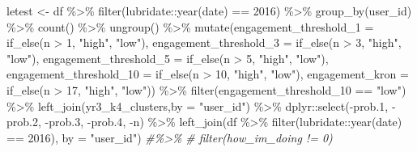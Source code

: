 \documentclass[
]{article}
\newenvironment{Shaded}{\begin{snugshade}}{\end{snugshade}}
\newcommand{\AttributeTok}[1]{\textcolor[rgb]{0.77,0.63,0.00}{#1}}
\newcommand{\CommentTok}[1]{\textcolor[rgb]{0.56,0.35,0.01}{\textit{#1}}}
\newcommand{\DecValTok}[1]{\textcolor[rgb]{0.00,0.00,0.81}{#1}}
\newcommand{\FloatTok}[1]{\textcolor[rgb]{0.00,0.00,0.81}{#1}}
\newcommand{\FunctionTok}[1]{\textcolor[rgb]{0.00,0.00,0.00}{#1}}
\newcommand{\NormalTok}[1]{#1}
\newcommand{\OtherTok}[1]{\textcolor[rgb]{0.56,0.35,0.01}{#1}}
\newcommand{\SpecialCharTok}[1]{\textcolor[rgb]{0.00,0.00,0.00}{#1}}
\newcommand{\StringTok}[1]{\textcolor[rgb]{0.31,0.60,0.02}{#1}}
\begin{document}
\begin{Shaded}
\begin{Highlighting}[]
\NormalTok{letest }\OtherTok{\textless{}{-}}\NormalTok{  df }\SpecialCharTok{\%\textgreater{}\%}
  \FunctionTok{filter}\NormalTok{(lubridate}\SpecialCharTok{::}\FunctionTok{year}\NormalTok{(date) }\SpecialCharTok{==} \DecValTok{2016}\NormalTok{) }\SpecialCharTok{\%\textgreater{}\%}
  \FunctionTok{group\_by}\NormalTok{(user\_id) }\SpecialCharTok{\%\textgreater{}\%}
  \FunctionTok{count}\NormalTok{() }\SpecialCharTok{\%\textgreater{}\%}
  \FunctionTok{ungroup}\NormalTok{() }\SpecialCharTok{\%\textgreater{}\%} 
  \FunctionTok{mutate}\NormalTok{(}\AttributeTok{engagement\_threshold\_1 =} \FunctionTok{if\_else}\NormalTok{(n }\SpecialCharTok{\textgreater{}} \DecValTok{1}\NormalTok{, }\StringTok{"high"}\NormalTok{, }\StringTok{"low"}\NormalTok{),}
         \AttributeTok{engagement\_threshold\_3 =} \FunctionTok{if\_else}\NormalTok{(n }\SpecialCharTok{\textgreater{}} \DecValTok{3}\NormalTok{, }\StringTok{"high"}\NormalTok{, }\StringTok{"low"}\NormalTok{),}
         \AttributeTok{engagement\_threshold\_5 =} \FunctionTok{if\_else}\NormalTok{(n }\SpecialCharTok{\textgreater{}} \DecValTok{5}\NormalTok{, }\StringTok{"high"}\NormalTok{, }\StringTok{"low"}\NormalTok{),}
         \AttributeTok{engagement\_threshold\_10 =} \FunctionTok{if\_else}\NormalTok{(n }\SpecialCharTok{\textgreater{}} \DecValTok{10}\NormalTok{, }\StringTok{"high"}\NormalTok{, }\StringTok{"low"}\NormalTok{),}
         \AttributeTok{engagement\_kron =} \FunctionTok{if\_else}\NormalTok{(n }\SpecialCharTok{\textgreater{}} \DecValTok{17}\NormalTok{, }\StringTok{"high"}\NormalTok{, }\StringTok{"low"}\NormalTok{)) }\SpecialCharTok{\%\textgreater{}\%} 
  \FunctionTok{filter}\NormalTok{(engagement\_threshold\_10 }\SpecialCharTok{==} \StringTok{"low"}\NormalTok{) }\SpecialCharTok{\%\textgreater{}\%} 
  \FunctionTok{left\_join}\NormalTok{(yr3\_k4\_clusters,}\AttributeTok{by =} \StringTok{"user\_id"}\NormalTok{) }\SpecialCharTok{\%\textgreater{}\%} 
\NormalTok{  dplyr}\SpecialCharTok{::}\FunctionTok{select}\NormalTok{(}\SpecialCharTok{{-}}\NormalTok{prob}\FloatTok{.1}\NormalTok{,}
          \SpecialCharTok{{-}}\NormalTok{prob}\FloatTok{.2}\NormalTok{,}
          \SpecialCharTok{{-}}\NormalTok{prob}\FloatTok{.3}\NormalTok{,}
          \SpecialCharTok{{-}}\NormalTok{prob}\FloatTok{.4}\NormalTok{,}
          \SpecialCharTok{{-}}\NormalTok{n) }\SpecialCharTok{\%\textgreater{}\%} 
  \FunctionTok{left\_join}\NormalTok{(df }\SpecialCharTok{\%\textgreater{}\%}
  \FunctionTok{filter}\NormalTok{(lubridate}\SpecialCharTok{::}\FunctionTok{year}\NormalTok{(date) }\SpecialCharTok{==} \DecValTok{2016}\NormalTok{),}
         \AttributeTok{by =} \StringTok{"user\_id"}\NormalTok{)}
\CommentTok{\#\%\textgreater{}\%}
\CommentTok{\#  filter(how\_im\_doing != 0)}



\end{Highlighting}
\end{Shaded}
\end{document}
